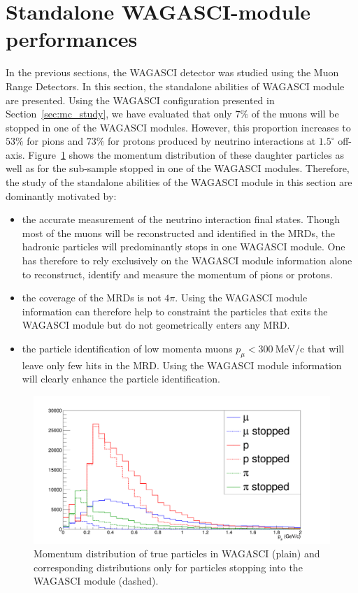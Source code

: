 \section{Standalone WAGASCI-module performances}
\label{sec:mc_study_standalone}

In the previous sections, the WAGASCI detector was studied using the Muon Range Detectors. In this section, the standalone abilities of WAGASCI module are presented. 
Using the WAGASCI configuration presented in Section~\ref{sec:mc_study}, we have evaluated that only $7\%$ of the muons will be stopped in one of the WAGASCI modules. 
However, this proportion increases to $53\%$ for pions and $73\%$ for protons produced by neutrino interactions at $1.5^{\circ}$ off-axis. Figure~\ref{fig:stoppedproportions} shows the momentum distribution of these daughter particles as well as for the sub-sample stopped in one of the WAGASCI modules. 
Therefore, the study of the standalone abilities of the WAGASCI module in this section are dominantly motivated by:
\begin{itemize}
\item the accurate measurement of the neutrino interaction final states. Though most of the muons will be reconstructed and identified in the MRDs, the hadronic particles will predominantly stops in one WAGASCI module. One has therefore to rely exclusively on the WAGASCI module information alone to reconstruct, identify and measure the momentum of pions or protons.
\item the coverage of the MRDs is not $4\pi$. Using the WAGASCI module information can therefore help to constraint the particles that exits the WAGASCI module but do not geometrically enters any MRD.
\item the particle identification of low momenta muons $p_{\mu} < 300~$MeV/c that will leave only few hits in the MRD. Using the WAGASCI module information will clearly enhance the particle identification.
\end{itemize}

\begin{figure}
  \centering
\includegraphics[width=.7\textwidth]{fig/StoppedProportionsMomentum.pdf}
\caption{\label{fig:stoppedproportions} Momentum distribution of true particles in WAGASCI (plain) and corresponding distributions only for particles stopping into the WAGASCI module (dashed).}
\end{figure}

